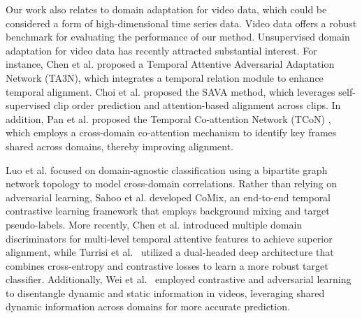 Our work also relates to domain adaptation for video data, which could be considered a form of high-dimensional time series data. Video data offers a robust benchmark for evaluating the performance of our method. Unsupervised domain adaptation for video data has recently attracted substantial interest. For instance, Chen et al. \cite{chen2019temporal} proposed a Temporal Attentive Adversarial Adaptation Network (TA3N), which integrates a temporal relation module to enhance temporal alignment. Choi et al. \cite{choi2020shuffle} proposed the SAVA method, which leverages self-supervised clip order prediction and attention-based alignment across clips. In addition, Pan et al. proposed the Temporal Co-attention Network (TCoN) \cite{pan2020adversarial}, which employs a cross-domain co-attention mechanism to identify key frames shared across domains, thereby improving alignment. 

Luo et al. \cite{luo2020adversarial} focused on domain-agnostic classification using a bipartite graph network topology to model cross-domain correlations. Rather than relying on adversarial learning, Sahoo et al. \cite{sahoo2021contrast} developed CoMix, an end-to-end temporal contrastive learning framework that employs background mixing and target pseudo-labels. More recently, Chen et al. \cite{chen2022multi} introduced multiple domain discriminators for multi-level temporal attentive features to achieve superior alignment, while Turrisi et al.~\cite{da2022dual} utilized a dual-headed deep architecture that combines cross-entropy and contrastive losses to learn a more robust target classifier. Additionally, Wei et al.~\cite{wei2023unsupervised} employed contrastive and adversarial learning to disentangle dynamic and static information in videos, leveraging shared dynamic information across domains for more accurate prediction.


